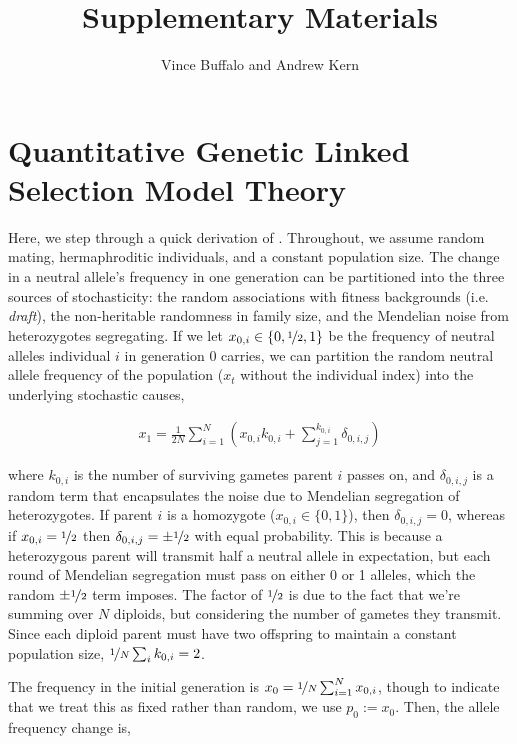 \documentclass[11pt]{article}
\title{Supplementary Materials}
\author{Vince Buffalo and Andrew Kern}
\begin{document}
\maketitle

\tableofcontents

\section{Quantitative Genetic Linked Selection Model Theory}

Here, we step through a quick derivation of \textcite{Santiago1995-hx}.
Throughout, we assume random mating, hermaphroditic individuals, and a constant
population size. The change in a neutral allele's frequency in one generation
can be partitioned into the three sources of stochasticity: the random
associations with fitness backgrounds (i.e. \emph{draft}), the non-heritable
randomness in family size, and the Mendelian noise from heterozygotes
segregating. If we let $x_{0,i} \in \{0, \nicefrac{1}{2}, 1\}$ be the frequency
of neutral alleles individual $i$ in generation 0 carries, we can partition the
random neutral allele frequency of the population ($x_t$ without the individual
index) into the underlying stochastic causes,

\begin{align}
  x_1 = \frac{1}{2N} \sum_{i=1}^N \left( x_{0,i}k_{0,i} + \sum_{j=1}^{k_{0,i}} \delta_{0,i,j} \right)
\end{align}

where $k_{0,i}$ is the number of surviving gametes parent $i$ passes on, and
$\delta_{0,i,j}$ is a random term that encapsulates the noise due to Mendelian
segregation of heterozygotes. If parent $i$ is a homozygote ($x_{0,i} \in \{0,
1\}$), then $\delta_{0,i,j} = 0$, whereas if $x_{0,i} = \nicefrac{1}{2}$ then
$\delta_{0,i,j} = \pm \nicefrac{1}{2}$ with equal probability. This is because
a heterozygous parent will transmit half a neutral allele in expectation, but
each round of Mendelian segregation must pass on either 0 or 1 alleles, which
the random $\pm \nicefrac{1}{2}$ term imposes. The factor of $\nicefrac{1}{2}$
is due to the fact that we're summing over $N$ diploids, but considering the
number of gametes they transmit. Since each diploid parent must have two
offspring to maintain a constant population size, $\nicefrac{1}{N} \sum_i
k_{0,i} = 2$. 

The frequency in the initial generation is $x_0 = \nicefrac{1}{N} \sum_{i=1}^N
x_{0,i}$, though to indicate that we treat this as fixed rather than random, we
use $p_0 := x_0$. Then, the allele frequency change is,
\end{document}
